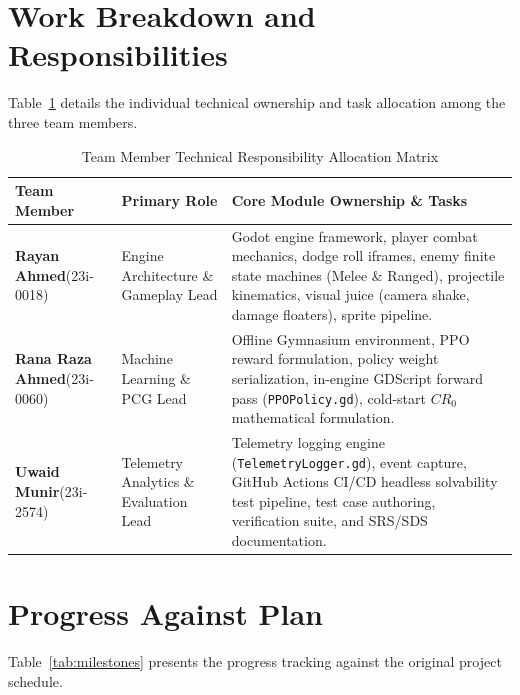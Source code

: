 \section{Work Breakdown and Responsibilities}
Table~\ref{tab:wbs} details the individual technical ownership and task allocation among the three team members.

\begin{table}[!htbp]
\centering
\caption{Team Member Technical Responsibility Allocation Matrix}
\label{tab:wbs}
\small
\begin{tabular}{p{}p{}p{}}
\toprule
\textbf{Team Member} & \textbf{Primary Role} & \textbf{Core Module Ownership \& Tasks} \\
\midrule
\textbf{Rayan Ahmed}\newline (23i-0018) & Engine Architecture \& Gameplay Lead & Godot engine framework, player combat mechanics, dodge roll iframes, enemy finite state machines (Melee \& Ranged), projectile kinematics, visual juice (camera shake, damage floaters), sprite pipeline. \\
\midrule
\textbf{Rana Raza Ahmed}\newline (23i-0060) & Machine Learning \& PCG Lead & Offline Gymnasium environment, PPO reward formulation, policy weight serialization, in-engine GDScript forward pass (\texttt{PPOPolicy.gd}), cold-start $CR_0$ mathematical formulation. \\
\midrule
\textbf{Uwaid Munir}\newline (23i-2574) & Telemetry Analytics \& Evaluation Lead & Telemetry logging engine (\texttt{TelemetryLogger.gd}), event capture, GitHub Actions CI/CD headless solvability test pipeline, test case authoring, verification suite, and SRS/SDS documentation. \\
\bottomrule
\end{tabular}
\end{table}

\section{Progress Against Plan}
Table~\ref{tab:milestones} presents the progress tracking against the original project schedule.

